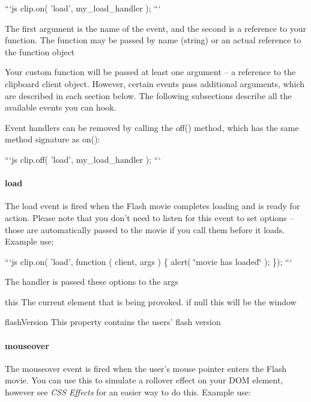 ```js clip.\-on( 'load', my\-\_\-load\-\_\-handler ); ```

The first argument is the name of the event, and the second is a reference to your function. The function may be passed by name (string) or an actual reference to the function object

Your custom function will be passed at least one argument -- a reference to the clipboard client object. However, certain events pass additional arguments, which are described in each section below. The following subsections describe all the available events you can hook.

Event handlers can be removed by calling the {\ttfamily off()} method, which has the same method signature as {\ttfamily on()}\-:

```js clip.\-off( 'load', my\-\_\-load\-\_\-handler ); ```

\paragraph*{load}

The {\ttfamily load} event is fired when the Flash movie completes loading and is ready for action. Please note that you don't need to listen for this event to set options -- those are automatically passed to the movie if you call them before it loads. Example use\-:

```js clip.\-on( 'load', function ( client, args ) \{ alert( \char`\"{}movie has loaded\char`\"{} ); \}); ```

The handler is passed these options to the {\ttfamily args}


\begin{DoxyDescription}
\item[this ]The current element that is being provoked. if null this will be the window 
\item[flash\-Version ]This property contains the users' flash version 
\end{DoxyDescription}

\paragraph*{mouseover}

The {\ttfamily mouseover} event is fired when the user's mouse pointer enters the Flash movie. You can use this to simulate a rollover effect on your D\-O\-M element, however see {\itshape C\-S\-S Effects} for an easier way to do this. Example use\-:

